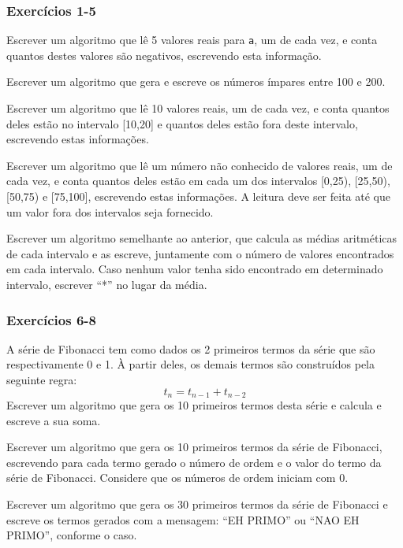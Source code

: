 \documentclass[xcolor={dvipsnames,table},aspectratio=169]{beamer}
\newcommand\setItemnumber[1]{\setcounter{enumi}{\numexpr#1-1\relax}}
\begin{document}
\begin{frame}[fragile]\frametitle{Exercícios 1-5}
\begin{enumerate}[1.]
{\small
\item Escrever um algoritmo que lê 5 valores reais para \texttt{a}, um de cada vez, e conta quantos destes valores são negativos, escrevendo esta informação.
\item Escrever um algoritmo que gera e escreve os números ímpares entre 100 e 200.
\item Escrever um algoritmo que lê 10 valores reais, um de cada vez, e conta quantos deles estão no intervalo [10,20] e quantos deles estão fora deste intervalo, escrevendo estas informações.
\item Escrever um algoritmo que lê um número não conhecido de valores reais, um de cada vez, e conta quantos deles estão em cada um dos intervalos [0,25), [25,50), [50,75) e [75,100], escrevendo estas informações. A leitura deve ser feita até que um valor fora dos intervalos seja fornecido.
\item Escrever um algoritmo semelhante ao anterior, que calcula as médias aritméticas de cada intervalo e as escreve, juntamente com o número de valores encontrados em cada intervalo. Caso nenhum valor tenha sido encontrado em determinado intervalo, escrever ``*'' no lugar da média.
}
\end{enumerate}
\end{frame}

\begin{frame}[fragile]\frametitle{Exercícios 6-8}
\begin{enumerate}[1.]
\setItemnumber{6}
{\small
\item A série de Fibonacci tem como dados os 2 primeiros termos da série que são respectivamente 0 e 1. À partir deles, os demais termos são construídos pela seguinte regra:
\[ t_{n} = t_{n-1} + t_{n-2} \]
Escrever um algoritmo que gera os 10 primeiros termos desta série e calcula e escreve a sua soma.
\item Escrever um algoritmo que gera os 10 primeiros termos da série de Fibonacci, escrevendo para cada termo gerado o número de ordem e o valor do termo da série de Fibonacci. Considere que os números de ordem iniciam com 0.
\item Escrever um algoritmo que gera os 30 primeiros termos da série de Fibonacci e escreve os termos gerados com a mensagem: ``EH PRIMO'' ou ``NAO EH PRIMO'', conforme o caso.
}
\end{enumerate}
\end{frame}

\end{document}
